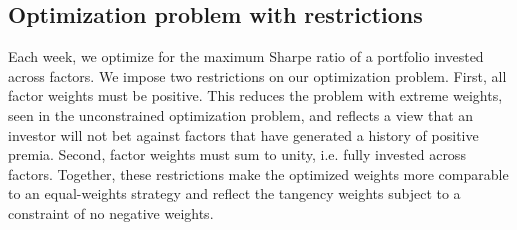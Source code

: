 

\subsection{Optimization problem with restrictions}

Each week, we optimize for the maximum Sharpe ratio of a portfolio invested across factors. We impose two restrictions on our optimization problem. First, all factor weights must be positive. This reduces the problem with extreme weights, seen in the unconstrained optimization problem, and reflects a view that an investor will not bet against factors that have generated a history of positive premia. Second, factor weights must sum to unity, i.e. fully invested across factors. Together, these restrictions make the optimized weights more comparable to an equal-weights strategy and reflect the tangency weights subject to a constraint of no negative weights.

